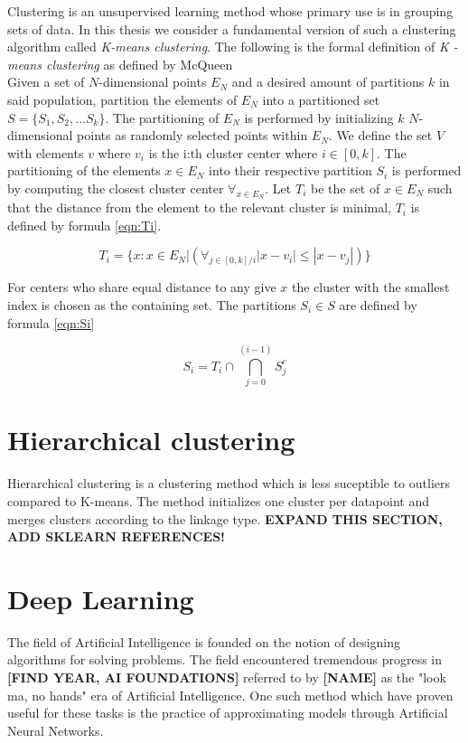 Clustering is an unsupervised learning method whose primary use is in grouping sets of data. In this thesis we consider a fundamental version of such a clustering algorithm called \textit{K-means clustering}. The following is the formal definition of \textit{K - means clustering} as defined by McQueen
\\
Given a set of $N$-dimensional points $E_N$ and a desired amount of partitions $k$ in said population, partition the elements of $E_N$ into a partitioned set $S = \{S_1, S_2, ... S_k\}$. The partitioning of $E_N$ is performed by initializing $k$  $N$-dimensional points as randomly selected points within $E_N$. We define the set $V$ with elements $v$ where $v_i$ is the i:th cluster center where $i \in [0, k]$. The partitioning of the elements $x \in E_N$ into their respective partition $S_i$ is performed by computing the closest cluster center $\forall_{x \in E_N}$. Let $T_i$ be the set of $x \in E_N$ such that the distance from the element to the relevant cluster is minimal, $T_i$ is defined by formula \ref{eqn:Ti}.

\begin{equation}
\label{eqn:Ti}
T_i = \{x : x \in E_N | (\forall_{j \in [0, k]/i } |x - v_i| \leq |x - v_j|)\} 
\end{equation}

For centers who share equal distance to any give $x$ the cluster with the smallest index is chosen as the containing set. The partitions $S_i \in S$ are defined by formula \ref{eqn:Si}

\begin{equation}
\label{eqn:Si}
S_i = T_i \cap \bigcap_{j=0}^{(i-1)} S_j^c
\end{equation}

\section{Hierarchical clustering}

Hierarchical clustering is a clustering method which is less suceptible to outliers compared to K-means. The method initializes one cluster per datapoint and merges clusters according to the linkage type. \textbf{EXPAND THIS SECTION, ADD SKLEARN REFERENCES!}

\section{Deep Learning}

The field of Artificial Intelligence is founded on the notion of designing algorithms for solving problems. The field encountered tremendous progress in \textbf{[FIND YEAR, AI FOUNDATIONS]} referred to by \textbf{[NAME]} as the "look ma, no hands" era of Artificial Intelligence. One such method which have proven useful for these tasks is the practice of approximating models through Artificial Neural Networks.

